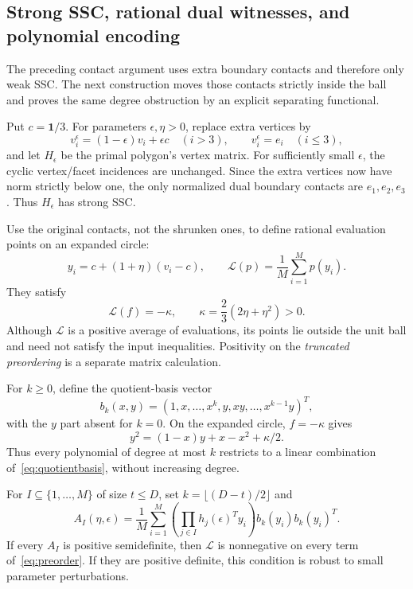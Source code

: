 \documentclass[11pt]{article}
\theoremstyle{definition}\newtheorem{definition}[theorem]{Definition}
\newcommand{\e}{\mathbf1}\newcommand{\cone}{\operatorname{cone}}
\begin{document}
\subsection{Strong SSC, rational dual witnesses, and polynomial encoding}
The preceding contact argument uses extra boundary contacts and therefore only weak SSC. The next construction moves those contacts strictly inside the ball and proves the same degree obstruction by an explicit separating functional.

Put $c=\e/3$. For parameters $\epsilon,\eta>0$, replace extra vertices by
\begin{equation}
 v_i^\epsilon=(1-\epsilon)v_i+\epsilon c\quad(i>3),
 \qquad v_i^\epsilon=e_i\quad(i\le3),
 \label{eq:shrink}
\end{equation}
and let $H_\epsilon$ be the primal polygon's vertex matrix. For sufficiently small $\epsilon$, the cyclic vertex/facet incidences are unchanged. Since the extra vertices now have norm strictly below one, the only normalized dual boundary contacts are $e_1,e_2,e_3$. Thus $H_\epsilon$ has strong SSC.

Use the original contacts, not the shrunken ones, to define rational evaluation points on an expanded circle:
\begin{equation}
 y_i=c+(1+\eta)(v_i-c),\qquad
 \mathcal L(p)=\frac1M\sum_{i=1}^M p(y_i).
 \label{eq:functional}
\end{equation}
They satisfy
\begin{equation}
 \mathcal L(f)=-\kappa,\qquad
 \kappa=\frac23(2\eta+\eta^2)>0.
 \label{eq:gapfunctional}
\end{equation}
Although $\mathcal L$ is a positive average of evaluations, its points lie outside the unit ball and need not satisfy the input inequalities. Positivity on the \emph{truncated preordering} is a separate matrix calculation.

For $k\ge0$, define the quotient-basis vector
\begin{equation}
 b_k(x,y)=(1,x,\ldots,x^k,y,xy,\ldots,x^{k-1}y)^T,
 \label{eq:quotientbasis}
\end{equation}
with the $y$ part absent for $k=0$. On the expanded circle, $f=-\kappa$ gives
\begin{equation}
 y^2=(1-x)y+x-x^2+\kappa/2.
\end{equation}
Thus every polynomial of degree at most $k$ restricts to a linear combination of~\eqref{eq:quotientbasis}, without increasing degree.

For $I\subseteq\{1,\ldots,M\}$ of size $t\le D$, set $k=\lfloor(D-t)/2\rfloor$ and
\begin{equation}
 A_I(\eta,\epsilon)=\frac1M\sum_{i=1}^M
 \left(\prod_{j\in I}h_j(\epsilon)^Ty_i\right)
 b_k(y_i)b_k(y_i)^T.
 \label{eq:localmatrix}
\end{equation}
If every $A_I$ is positive semidefinite, then $\mathcal L$ is nonnegative on every term of~\eqref{eq:preorder}. If they are positive definite, this condition is robust to small parameter perturbations.
\end{document}
